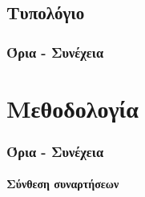 \documentclass[a4paper,11pt,twoside]{article}
\newcommand{\myleftmark}{\leftmark}
\renewcommand{\myleftmark}{{\large Τυπολόγιο}}
\begin{document}
\newpage
\renewcommand{\myleftmark}{{\large Τυπολόγιο}}
\begin{center}
\part{Τυπολόγιο}
\end{center}
\section{Όρια - Συνέχεια}
\part{Μεθοδολογία}
\section{Όρια - Συνέχεια}
\subsection{Σύνθεση συναρτήσεων}
\end{document}
